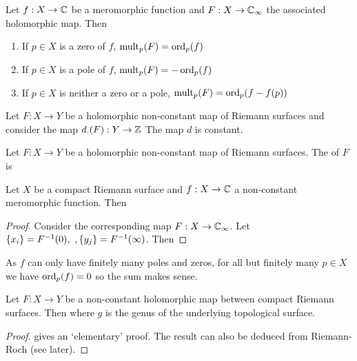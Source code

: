 \documentclass{article}
\begin{document}
\begin{prop}
	Let $f:X \to \mathbb{C}$ be a meromorphic function and $F:X \to \mathbb{C}_\infty$ the associated holomorphic map. Then 
	\begin{enumerate}
		\item If $p \in X$ is a zero of $f$, $\operatorname{mult}_p(F) = \operatorname{ord}_p(f)$
		\item If $p \in X$ is a pole of $f$, $\operatorname{mult}_p(F) = -\operatorname{ord}_p(f)$
		\item If $p \in X$ is neither a zero or a pole, $\operatorname{mult}_p(F) = \operatorname{ord}_p(f-f(p))$
	\end{enumerate}
\end{prop}

\begin{prop}
	Let $F:X \to Y$ be a holomorphic non-constant map of Riemann surfaces and consider the map $d_{\cdot}(F):Y \to \mathbb{Z}$ 
	The map $d$ is constant. 
\end{prop}

\begin{definition}
	Let $F:X \to Y$ be a holomorphic non-constant map of Riemann surfaces. The  of $F$ is 
\end{definition}

\begin{prop}
	Let $X$ be a compact Riemann surface and $f:X \to \mathbb{C}$ a non-constant meromorphic function. Then 
\end{prop}
\begin{proof}
	Consider the corresponding map $F: X \to \mathbb{C}_\infty$. Let $\left\{ x_i \right\} = F^{-1}(0), \ ,\left\{ y_j \right\} = F^{-1}(\infty)$. Then 
\end{proof}

\begin{remark}
	As $f$ can only have finitely many poles and zeros, for all but finitely many $p \in X$ we have $\operatorname{ord}_p(f) = 0$ so the sum makes sense. 
\end{remark}

\begin{theorem}
	Let $F:X \to Y$ be a non-constant holomorphic map between compact Riemann surfaces. Then 
	where $g$ is the genus of the underlying topological surface. 
\end{theorem}
\begin{proof}
	\cite{Miranda1995} gives an `elementary' proof. The result can also be deduced from Riemann-Roch (see later). 
\end{proof}
\end{document}
